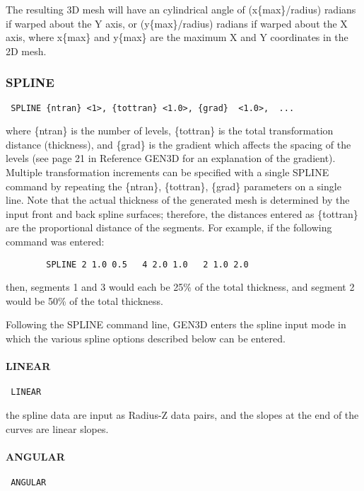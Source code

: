 The resulting 3D mesh will have an cylindrical angle of (x\{max\}/radius)
radians if warped about the Y axis, or (y\{max\}/radius) radians if warped
about the X axis, where x\{max\} and y\{max\} are the maximum X and Y
coordinates in the 2D mesh. 
\subsubsection{SPLINE}
\begin{verbatim}
 SPLINE {ntran} <1>, {tottran} <1.0>, {grad}  <1.0>,  ...
\end{verbatim}

where \{ntran\} is the number of levels, \{tottran\} is the total
transformation distance (thickness), and \{grad\} is the gradient which
affects the spacing of the levels (see page 21 in Reference GEN3D
for an explanation of the gradient).  Multiple transformation increments
can be specified with a single SPLINE command by repeating the \{ntran\},
\{tottran\}, \{grad\} parameters on a single line.  Note that the actual
thickness of the generated mesh is determined by the input front and
back spline surfaces; therefore, the distances entered as \{tottran\} are
the proportional distance of the segments.  For example, if the
following command was entered:

\begin{verbatim}
        SPLINE 2 1.0 0.5   4 2.0 1.0   2 1.0 2.0
\end{verbatim}

then, segments 1 and 3 would each be 25\% of the total thickness, and
segment 2 would be 50\% of the total thickness.

Following the SPLINE command line, GEN3D enters the spline input mode in
which the various spline options described below can be entered.
\paragraph{LINEAR}
\begin{verbatim}
 LINEAR
\end{verbatim}

the spline data are input as Radius-Z data pairs, and the slopes at the
end of the curves are linear slopes.
\paragraph{ANGULAR}
\begin{verbatim}
 ANGULAR
\end{verbatim}

